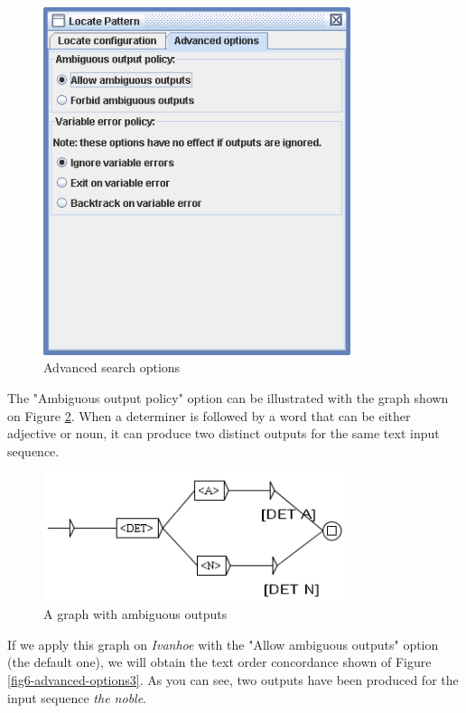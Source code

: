 \bigskip
\begin{figure}[!h]
\begin{center}
\includegraphics[width=9cm]{resources/img/fig6-advanced-options1.png}
\caption{Advanced search options\label{fig6-advanced-options1}}
\end{center}
\end{figure}

\noindent The "Ambiguous output policy" option can be illustrated with the
graph shown on Figure \ref{fig6-advanced-options2}. When a determiner is
followed by a word that can be either adjective or noun, it can produce two
distinct outputs for the same text input sequence.

\bigskip
\begin{figure}[!h]
\begin{center}
\includegraphics[width=9cm]{resources/img/fig6-advanced-options2.png}
\caption{A graph with ambiguous outputs\label{fig6-advanced-options2}}
\end{center}
\end{figure}

\noindent If we apply this graph on \textit{Ivanhoe} with the "Allow ambiguous
outputs" option (the default one), we will obtain the text order
concordance shown of Figure \ref{fig6-advanced-options3}. As you can see, two
outputs have been produced for the input sequence \textit{the noble}.

